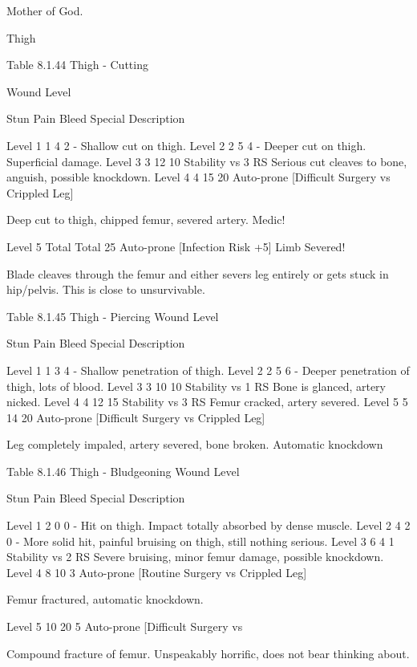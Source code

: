 \documentclass[oneside,11pt,english]{book}
\begin{document}
Mother of God. 

 

 

 

 

 

Thigh 

 

Table 8.1.44 Thigh - Cutting 


Wound 
Level 

Stun Pain Bleed Special Description 

Level 1 1 4 2 - Shallow cut on thigh. 
Level 2 2 5 4 - Deeper cut on thigh. Superficial damage. 
Level 3 3 12 10 Stability vs 3 RS Serious cut cleaves to bone, anguish, possible 
knockdown. 
Level 4 4 15 20 Auto-prone 
[Difficult Surgery 
vs Crippled Leg] 

Deep cut to thigh, chipped femur, severed artery. Medic! 

Level 5 Total Total 25 Auto-prone 
[Infection Risk +5] 
Limb Severed! 

Blade cleaves through the femur and either severs leg 
entirely or gets stuck in hip/pelvis. This is close to 
unsurvivable. 

 
Table 8.1.45 Thigh - Piercing 
Wound 
Level 

Stun Pain Bleed Special Description 

Level 1 1 3 4 - Shallow penetration of thigh. 
Level 2 2 5 6 - Deeper penetration of thigh, lots of blood. 
Level 3 3 10 10 Stability vs 1 RS Bone is glanced, artery nicked. 
Level 4 4 12 15 Stability vs 3 RS Femur cracked, artery severed. 
Level 5 5 14 20 Auto-prone 
[Difficult Surgery vs 
Crippled Leg] 

Leg completely impaled, artery severed, bone 
broken. Automatic knockdown 

 
Table 8.1.46 Thigh - Bludgeoning 
Wound 
Level 

Stun Pain Bleed Special Description 

Level 1 2 0 0 - Hit on thigh. Impact totally absorbed by dense 
muscle. 
Level 2 4 2 0 - More solid hit, painful bruising on thigh, still 
nothing serious. 
Level 3 6 4 1 Stability vs 2 RS Severe bruising, minor femur damage, possible 
knockdown. 
Level 4 8 10 3 Auto-prone 
[Routine Surgery vs 
Crippled Leg] 

Femur fractured, automatic knockdown. 

Level 5 10 20 5 Auto-prone 
[Difficult Surgery vs 

Compound fracture of femur. Unspeakably horrific, 
does not bear thinking about. 
\end{document}
